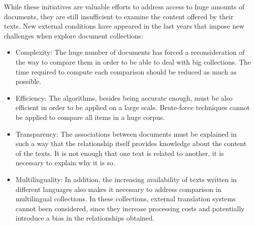 While these initiatives are valuable efforts to address access to huge amounts of documents, they are still insufficient to examine the content offered by their texts. New external conditions have appeared in the last years that impose new challenges when explore document collections:
\begin{itemize}
\item Complexity: The huge number of documents has forced a reconsideration of the way to compare them in order to be able to deal with big collections. The time required to compute each comparison should be reduced as much as possible.
\item Efficiency: The algorithms, besides being accurate enough, must be also efficient in order to be applied on a large scale. Brute-force techniques cannot be applied to compare all items in a huge corpus.
\item Transparency: The associations between documents must be explained in such a way that the relationship itself provides knowledge about the content of the texts. It is not enough that one text is related to another, it is necessary to explain why it is so. 
\item Multilinguality: In addition, the increasing availability of texts written in different languages also makes it necessary to address comparison in multilingual collections. In these collections, external translation systems cannot been considered, since they increase processing costs and potentially introduce a bias in the relationships obtained. 
\end{itemize}

    

